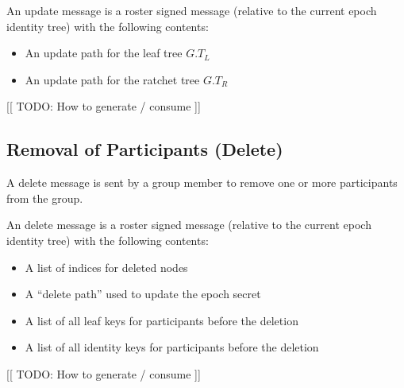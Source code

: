 \documentclass[11pt, oneside]{article}
\begin{document}
An update message is a roster signed message (relative to the current epoch identity tree) with the following contents:

\begin{itemize}
\item{An update path for the leaf tree $G.T_L$}
\item{An update path for the ratchet tree $G.T_R$}
\end{itemize}

[[ TODO: How to generate / consume ]]


\subsection{Removal of Participants (Delete)}

A delete message is sent by a group member to remove one or more participants from the group.

An delete message is a roster signed message (relative to the current epoch identity tree) with the following contents:

\begin{itemize}
\item{A list of indices for deleted nodes}
\item{A ``delete path'' used to update the epoch secret}
\item{A list of all leaf keys for participants before the deletion}
\item{A list of all identity keys for participants before the deletion}
\end{itemize}

[[ TODO: How to generate / consume ]]
\end{document}
